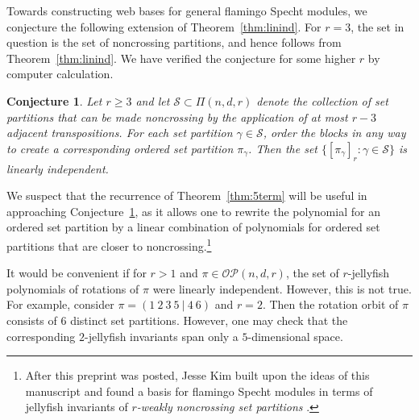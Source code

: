 \documentclass[10pt]{amsart}
\theoremstyle{definition}
\theoremstyle{plain}
\theoremstyle{plain}
\theoremstyle{definition}
\theoremstyle{remark}
\theoremstyle{plain}
\theoremstyle{plain}
\theoremstyle{plain}
\newtheorem{conjecture}[cdrthm]{Conjecture}
\numberwithin{equation}{section}
\newcommand{\setpart}{\Pi}
\newcommand{\ordsetpart}{\mathcal{OP}}
\begin{document}
Towards constructing web bases for general flamingo Specht modules, we conjecture the following extension of Theorem~\ref{thm:linind}.
For $r = 3$, the set in question is the set of noncrossing partitions, and hence follows from Theorem~\ref{thm:linind}. We have verified the conjecture for some higher $r$ by computer calculation.
\begin{conjecture}\label{conj:more_linind}
Let $r \geq 3$ and let $\mathscr{S} \subset \setpart(n,d,r)$ denote the collection of set partitions that can be made noncrossing by the application of at most $r-3$ adjacent transpositions. For each set partition $\gamma \in \mathscr{S}$, order the blocks in any way to create a corresponding ordered set partition $\pi_\gamma$. Then the set $\{ [\pi_\gamma]_r : \gamma \in \mathscr{S} \}$ is linearly independent.
\end{conjecture}

We suspect that the recurrence of Theorem~\ref{thm:5term} will be useful in approaching Conjecture~\ref{conj:more_linind}, as it allows one to rewrite the polynomial for an ordered set partition by a linear combination of polynomials for ordered set partitions that are closer to noncrossing.\footnote{After this preprint was posted, Jesse Kim built upon the ideas of this manuscript and found a basis for flamingo Specht modules in terms of jellyfish invariants of \emph{$r$-weakly noncrossing set partitions} \cite{Kim:3row}.}


It would be convenient if for $r>1$ and $\pi \in \ordsetpart(n,d,r)$, the set of $r$-jellyfish polynomials of rotations of $\pi$ were linearly independent. However, this is not true. For example, consider $\pi = ( 1 \ 2 \ 3 \ 5 \ | \ 4 \ 6 )$ and $r=2$. Then the rotation orbit of $\pi$ consists of $6$ distinct set partitions. However, one may check that the corresponding $2$-jellyfish invariants span only a $5$-dimensional space.
\end{document}
